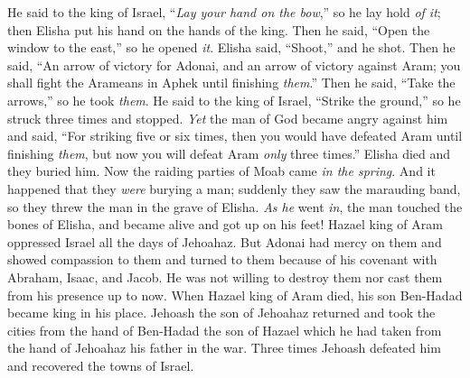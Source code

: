 \begin{biblechapter}
\verse He said to the king of Israel, “\textit{Lay your hand on the bow},” so he lay hold \textit{of it}; then Elisha put his hand on the hands of the king.
\verse Then he said, “Open the window to the east,” so he opened \textit{it}. Elisha said, “Shoot,” and he shot. Then he said, “An arrow of victory for Adonai, and an arrow of victory against Aram; you shall fight the Arameans in Aphek until finishing \textit{them}.”
\verse Then he said, “Take the arrows,” so he took \textit{them}. He said to the king of Israel, “Strike the ground,” so he struck three times and stopped.
\verse \textit{Yet} the man of God became angry against him and said, “For striking five or six times, then you would have defeated Aram until finishing \textit{them}, but now you will defeat Aram \textit{only} three times.”
\verse Elisha died and they buried him. Now the raiding parties of Moab came \textit{in the spring}.
\verse And it happened that they \textit{were} burying a man; suddenly they saw the marauding band, so they threw the man in the grave of Elisha. \textit{As he} went \textit{in}, the man touched the bones of Elisha, and became alive and got up on his feet!
\verse Hazael king of Aram oppressed Israel all the days of Jehoahaz.
\verse But Adonai had mercy on them and showed compassion to them and turned to them because of his covenant with Abraham, Isaac, and Jacob. He was not willing to destroy them nor cast them from his presence up to now.
\verse When Hazael king of Aram died, his son Ben-Hadad became king in his place.
\verse Jehoash the son of Jehoahaz returned and took the cities from the hand of Ben-Hadad the son of Hazael which he had taken from the hand of Jehoahaz his father in the war. Three times Jehoash defeated him and recovered the towns of Israel.
\end{biblechapter}

